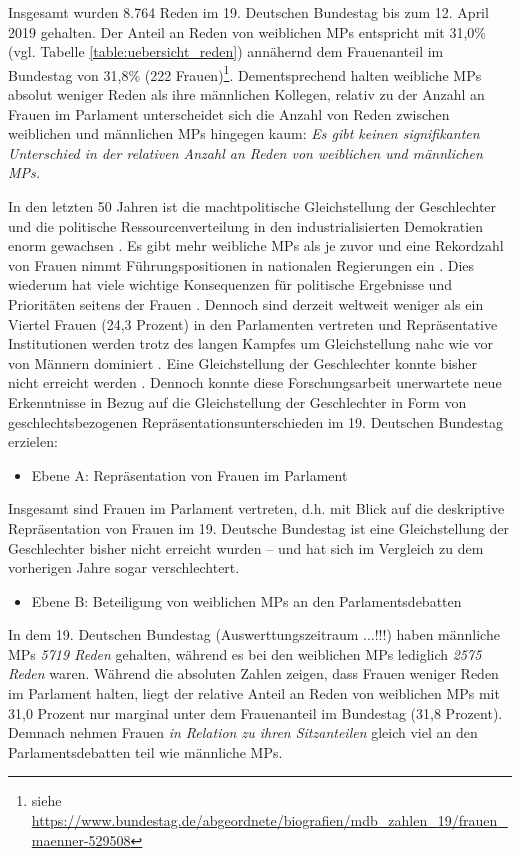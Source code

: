 \documentclass[12pt, 
    twoside=false, 
    bibliography=totoc, 
    numbers=endperiod, 
    headings=normal, 
    toc=chapterentrydotfill
    ]{scrbook}
\begin{document}
Insgesamt wurden 8.764 Reden im 19. Deutschen Bundestag bis zum 12. April 2019 gehalten.  Der Anteil an Reden von weiblichen MPs entspricht mit 31,0\% (vgl. Tabelle \ref{table:uebersicht_reden}) annähernd dem Frauenanteil im Bundestag von 31,8\% (222 Frauen)\footnote{siehe \url{https://www.bundestag.de/abgeordnete/biografien/mdb_zahlen_19/frauen_maenner-529508}}. Dementsprechend halten weibliche MPs absolut weniger Reden als ihre männlichen Kollegen, relativ zu der Anzahl an Frauen im Parlament unterscheidet sich die Anzahl von Reden zwischen weiblichen und männlichen MPs hingegen kaum: \emph{Es gibt keinen signifikanten Unterschied in der relativen Anzahl an Reden von weiblichen und männlichen MPs.}


In den letzten 50 Jahren ist die machtpolitische Gleichstellung der Geschlechter und die politische Ressourcenverteilung in den industrialisierten Demokratien enorm gewachsen \parencite[318]{coffe_2010}. Es gibt mehr weibliche MPs als je zuvor und eine Rekordzahl von Frauen nimmt Führungspositionen in nationalen Regierungen ein  \parencites{lovenduski_2005}{paxton_2007}. Dies wiederum hat viele wichtige Konsequenzen für politische Ergebnisse und Prioritäten seitens der Frauen \parencites{bolzendahl_2007}{carroll_2001}{waring_2000}[318]{coffe_2010}. Dennoch sind derzeit weltweit weniger als ein Viertel Frauen (24,3 Prozent) in den Parlamenten vertreten \parencite{ipu_2019} und Repräsentative Institutionen werden trotz des langen Kampfes um Gleichstellung nahc wie vor von Männern dominiert \parencites[149]{celis_2018}[497 f.]{childs_2013}{dahlerup_2013}{bjarnegard_2013}. Eine Gleichstellung der Geschlechter konnte bisher nicht erreicht werden \parencite[150]{celis_2018}.
Dennoch konnte diese Forschungsarbeit unerwartete neue Erkenntnisse in Bezug auf die Gleichstellung der Geschlechter in Form von geschlechtsbezogenen Repräsentationsunterschieden im 19. Deutschen Bundestag erzielen:

\begin{itemize}
   \item Ebene A: Repräsentation von Frauen im Parlament
 \end{itemize}
Insgesamt sind Frauen im Parlament vertreten, d.h. mit Blick auf die deskriptive Repräsentation von Frauen im 19. Deutsche Bundestag ist eine Gleichstellung der Geschlechter bisher nicht erreicht wurden -- und hat sich im Vergleich zu dem vorherigen Jahre sogar verschlechtert. 

 \begin{itemize}
    \item Ebene B: Beteiligung von weiblichen MPs an den Parlamentsdebatten
\end{itemize}
In dem 19. Deutschen Bundestag (Auswerttungszeitraum ...!!!) haben männliche MPs \emph{5719 Reden} gehalten, während es bei den weiblichen MPs lediglich \emph{2575 Reden} waren. Während die absoluten Zahlen zeigen, dass Frauen weniger Reden im Parlament halten, liegt der relative Anteil an Reden von weiblichen MPs mit 31,0 Prozent nur marginal unter dem Frauenanteil im Bundestag (31,8 Prozent). Demnach nehmen Frauen \emph{in Relation zu ihren Sitzanteilen} gleich viel an den Parlamentsdebatten teil wie männliche MPs.
\end{document}
